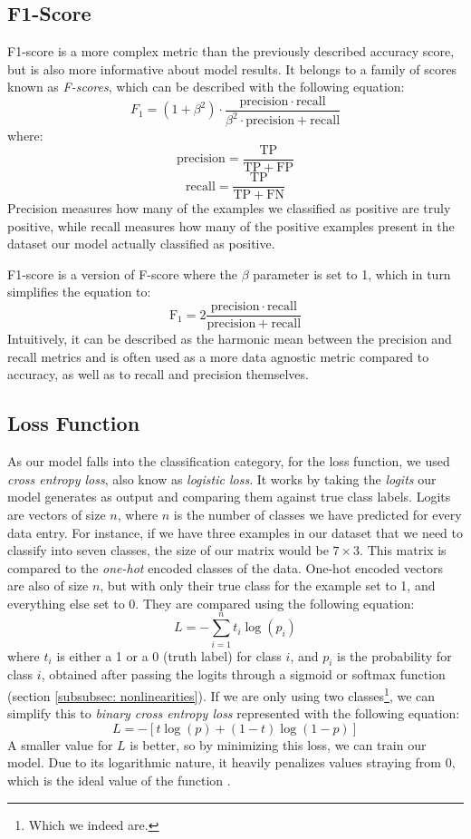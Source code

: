 \documentclass[times, utf8, diplomski, english]{fer_eng}
\begin{document}
\subsection{F1-Score}
\label{subsec:f1 score}

F1-score is a more complex metric than the previously described accuracy score, but is also more informative about model results. It belongs to a family of scores known as \textit{F-scores}, which can be described with the following equation:
\[ F_1 = (1 + \beta^2) \cdot \frac{\mathrm{precision} \cdot \mathrm{recall}}{\beta^2 \cdot \mathrm{precision} + \mathrm{recall}} \] where:
\[ \mathrm{precision} = \frac{\mathrm{TP}}{\mathrm{TP} + \mathrm{FP}} \]
\[ \mathrm{recall} = \frac{\mathrm{TP}}{\mathrm{TP} + \mathrm{FN}} \]
Precision measures how many of the examples we classified as positive are truly positive, while recall measures how many of the positive examples present in the dataset our model actually classified as positive.

F1-score is a version of F-score where the $\beta$ parameter is set to 1, which in turn simplifies the equation to:
\[ \mathrm{F_1} = 2 \frac{\mathrm{precision} \cdot \mathrm{recall}}{\mathrm{precision} + \mathrm{recall}} \]
Intuitively, it can be described as the harmonic mean between the precision and recall metrics and is often used as a more data agnostic metric compared to accuracy, as well as to recall and precision themselves.

\subsection{Loss Function}
\label{subsec:loss function}

As our model falls into the classification category, for the loss function, we used \textit{cross entropy loss}, also know as \textit{logistic loss}. It works by taking the \textit{logits} our model generates as output and comparing them against true class labels. Logits are vectors of size $n$, where $n$ is the number of classes we have predicted for every data entry. For instance, if we have three examples in our dataset that we need to classify into seven classes, the size of our matrix would be $7 \times 3$. This matrix is compared to the \textit{one-hot} encoded classes of the data. One-hot encoded vectors are also of size $n$, but with only their true class for the example set to 1, and everything else set to 0. They are compared using the following equation:
\[ L = - \sum_{i = 1}^n t_i \log (p_i) \]
where $t_i$ is either a 1 or a 0 (truth label) for class $i$, and $p_i$ is the probability for class $i$, obtained after passing the logits through a sigmoid or softmax function (section \ref{subsubsec: nonlinearities}). If we are only using two classes\footnote{Which we indeed are.}, we can simplify this to \textit{binary cross entropy loss} represented with the following equation:
\[ L = - [t \log (p) + (1 - t) \log (1 - p)] \]
A smaller value for $L$ is better, so by minimizing this loss, we can train our model. Due to its logarithmic nature, it heavily penalizes values straying from 0, which is the ideal value of the function \cite{CEL}.
\end{document}

